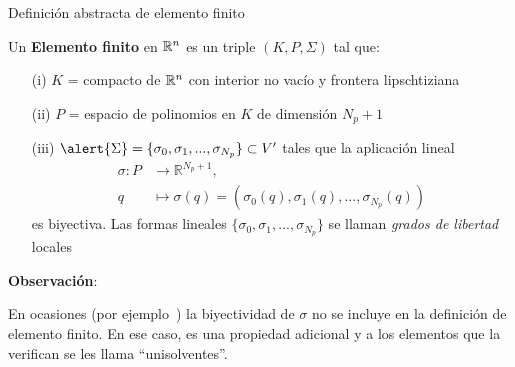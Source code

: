 \documentclass[9pt,leqno]{beamer}
\newcommand{\Np}{{N_p}}
\begin{document}
\begin{frame}{Definición abstracta de elemento finito}
  \begin{definition}
    Un \textbf{\alert{Elemento finito}} en ${\mathbb R}^n$ es un triple
    $(K,P,\Sigma)$ tal que:
    \smallskip
    \begin{itemize}
    \item[(i)] \alert{$K$} = compacto de ${\mathbb R}^n$ con interior no vac\'io y
      frontera lipschtiziana
    \item[(ii)] \alert{$P$} = espacio de polinomios en $K$ de dimensi\'on $\Np+1$
    \item[(iii)] $\alert{\Sigma}=\{\sigma_0,\sigma_1,...,\sigma_{\Np}\} \subset V'$
      tales que la aplicaci\'on lineal
      \begin{align*}
        \sigma: P& \longrightarrow \mathbb{R}^{\Np+1},\\
        q& \longmapsto \sigma(q)=(\sigma_0(q), \sigma_1(q),..., \sigma_{\Np}(q))
      \end{align*}
      es biyectiva. Las formas lineales
      $\{\sigma_0,\sigma_1,...,\sigma_{\Np}\}$ se llaman
      \textit{grados de libertad} locales
    \end{itemize}
  \end{definition}

  \par\bigskip
  \scriptsize \textbf{Observación}:
  \par\medskip
  En ocasiones (por
  ejemplo~\cite{Ciarlet:78}) la biyectividad de $\sigma$ no se incluye
  en la definición de elemento finito. En ese caso, es una propiedad
  adicional y a los elementos que la verifican se les llama
  ``unisolventes''.
\end{frame}
\end{document}
